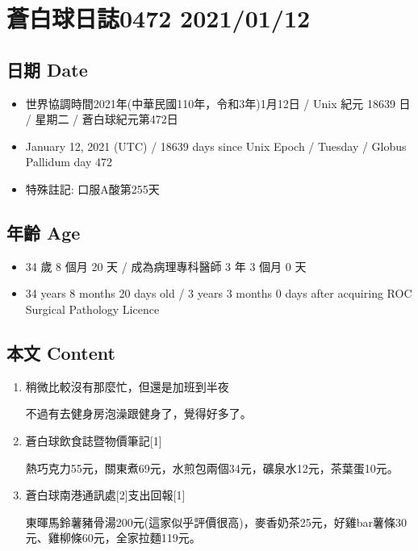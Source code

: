 \documentclass[a5paper, 10pt
]{book}
\providecommand{\tightlist}{%
  \setlength{\itemsep}{0pt}\setlength{\parskip}{0pt}}
\begin{document}
\hypertarget{ux84bcux767dux7403ux65e5ux8a8c0472-20210112}{%
\section{蒼白球日誌0472
2021/01/12}\label{ux84bcux767dux7403ux65e5ux8a8c0472-20210112}}

\hypertarget{ux65e5ux671f-date-42}{%
\subsection{日期 Date}\label{ux65e5ux671f-date-42}}

\begin{itemize}
\tightlist
\item
  世界協調時間2021年(中華民國110年，令和3年)1月12日 / Unix 紀元 18639 日
  / 星期二 / 蒼白球紀元第472日
\item
  January 12, 2021 (UTC) / 18639 days since Unix Epoch / Tuesday /
  Globus Pallidum day 472
\item
  特殊註記: 口服A酸第255天
\end{itemize}

\hypertarget{ux5e74ux9f61-age-42}{%
\subsection{年齡 Age}\label{ux5e74ux9f61-age-42}}

\begin{itemize}
\tightlist
\item
  34 歲 8 個月 20 天 / 成為病理專科醫師 3 年 3 個月 0 天
\item
  34 years 8 months 20 days old / 3 years 3 months 0 days after
  acquiring ROC Surgical Pathology Licence
\end{itemize}

\hypertarget{ux672cux6587-content-42}{%
\subsection{本文 Content}\label{ux672cux6587-content-42}}

\begin{enumerate}
\def\labelenumi{\arabic{enumi}.}
\item
  稍微比較沒有那麼忙，但還是加班到半夜

  不過有去健身房泡澡跟健身了，覺得好多了。
\item
  蒼白球飲食誌暨物價筆記{[}1{]}

  熱巧克力55元，關東煮69元，水煎包兩個34元，礦泉水12元，茶葉蛋10元。
\item
  蒼白球南港通訊處{[}2{]}支出回報{[}1{]}

  東暉馬鈴薯豬骨湯200元(這家似乎評價很高)，麥香奶茶25元，好雞bar薯條30元、雞柳條60元，全家拉麵119元。
\end{enumerate}
\end{document}
